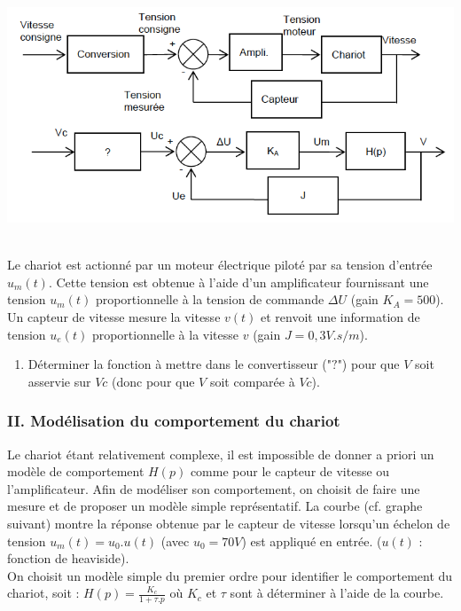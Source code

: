 \\ \hspace*{0mm}
\begin{center}\includegraphics[scale=0.6]{png/bloc1_prob2.png}\end{center}
\hspace*{0mm}
\\ Le chariot est actionn\'e par un moteur \'electrique pilot\'e par sa tension d'entr\'ee $u_m(t)$. Cette tension est obtenue \`a l'aide d'un amplificateur fournissant une tension $u_m(t)$ proportionnelle \`a la tension de commande $\Delta U$ (gain $K_A = 500$). Un capteur de vitesse mesure la vitesse $v(t)$ et renvoit une information de tension $u_e(t)$
proportionnelle \`a la vitesse $v$ (gain $J = 0,3 V.s/m$).


\begin{enumerate}
\item D\'eterminer la fonction \`a mettre dans le convertisseur ("$?$") pour que $V$ soit asservie sur
$Vc$ (donc pour que $V$ soit compar\'ee \`a $Vc$).
\end{enumerate}

\subsubsection{II. Mod\'elisation du comportement du chariot}
Le chariot \'etant relativement complexe, il est impossible de donner a priori un mod\`ele de comportement $H(p)$ comme pour le capteur de vitesse ou l'amplificateur. Afin de mod\'eliser son comportement, on choisit de faire une mesure et de proposer un mod\`ele simple repr\'esentatif. La courbe (cf. graphe suivant) montre la r\'eponse obtenue par le capteur de vitesse lorsqu'un \'echelon de tension $u_m(t) = u_0.u(t)$ (avec $u_0 = 70 V$) est appliqu\'e en entr\'ee. ($u(t)$ : fonction de heaviside).
\\ On choisit un mod\`ele simple du premier ordre pour identifier le comportement du chariot, soit : \(H(p)=\frac{K_c}{1+\tau .p}\) o\`u $K_c$ et $\tau$ sont \`a d\'eterminer \`a l'aide de la courbe.

